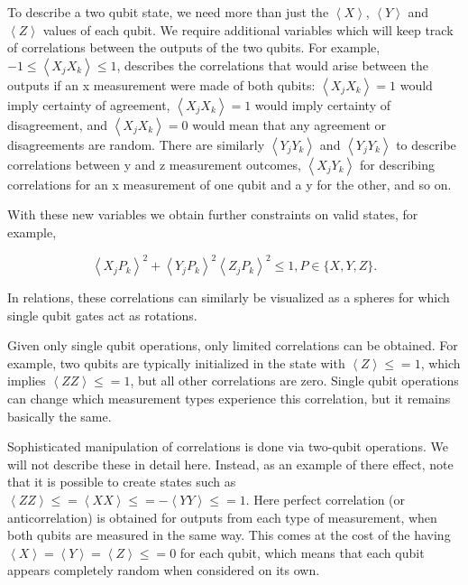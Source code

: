 \documentclass[conference]{IEEEtran}
\begin{document}
To describe a two qubit state, we need more than just the $\left\langle X\right\rangle$, $\left\langle Y\right\rangle$ and $\left\langle Z\right\rangle$  values of each qubit. We require additional variables which will keep track of correlations between the outputs of the two qubits. For example, $-1 \leq \left\langle X_j X_k \right\rangle \leq 1$, describes the correlations that would arise between the outputs if an x measurement were made of both qubits: $\left\langle X_j X_k\right\rangle = 1$ would imply certainty of agreement, $\left\langle X_j X_k\right\rangle = 1$ would imply certainty of disagreement, and $\left\langle X_j X_k\right\rangle = 0$ would mean that any agreement or disagreements are random. There are similarly $\left\langle Y_j Y_k\right\rangle$ and $\left\langle Y_j Y_k\right\rangle$ to describe correlations between y and z measurement outcomes, $\left\langle X_j Y_k \right\rangle$ for describing correlations for an x measurement of one qubit and a y for the other, and so on.

With these new variables we obtain further constraints on valid states, for example,

\begin{equation} \label{heisenberg2}
\left\langle X_j P_k \right\rangle^2 + \left\langle Y_j P_k \right\rangle^2 \left\langle Z_j P_k \right\rangle^2 \leq 1, P \in \{X,Y,Z\}.
\end{equation}

In relations, these correlations can similarly be visualized as a spheres for which single qubit gates act as rotations.

Given only single qubit operations, only limited correlations can be obtained. For example, two qubits are typically initialized in the state with $\left\langle Z\right\rangle \leq=1$, which implies $\left\langle ZZ\right\rangle \leq=1$, but all other correlations are zero. Single qubit operations can change which measurement types experience this correlation, but it remains basically the same.

Sophisticated manipulation of correlations is done via two-qubit operations. We will not describe these in detail here. Instead, as an example of there effect, note that it is possible to create states such as  $\left\langle ZZ\right\rangle \leq=\left\langle XX\right\rangle \leq=-\left\langle YY\right\rangle \leq = 1$. Here perfect correlation (or anticorrelation) is obtained for outputs from each type of measurement, when both qubits are measured in the same way. This comes at the cost of the having $\left\langle X\right\rangle=\left\langle Y\right\rangle=\left\langle Z\right\rangle \leq=0$ for each qubit, which means that each qubit appears completely random when considered on its own.
\end{document}

